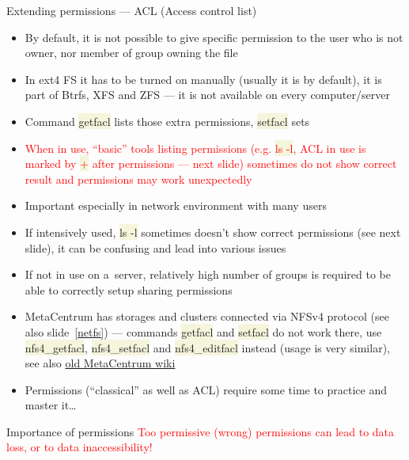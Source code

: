 \documentclass[compress, xelatex, 11pt, xcolor=svgnames, aspectratio=169,
	hyperref={
		bookmarks=true,
		unicode=true,
		colorlinks=true,
		pdftitle={Linux, command line and MetaCentrum},
		plainpages=false,
		pdfauthor={Vojtech Zeisek},
		pdfsubject={Course about use of Linux command line, writing shell scripts and using MetaCentrum of CESNET},
		pdfcreator={XeLaTeX},
		pdfkeywords={Linux, GNU, BASH, shell, command line, MetaCentrum},
		linkcolor=DarkRed, %
		anchorcolor=DarkBlue, %
		citecolor=Indigo, %
		filecolor=NavyBlue, %
		menucolor=DarkMagenta, %
		urlcolor=DarkBlue, %
		},
	url={hyphens, lowtilde} %
	]{beamer}
\renewcommand{\texttt}[1]{\colorbox{Beige}{{\ttfamily #1}}}
\renewcommand{\alert}[1]{\textcolor{red}{#1}}
\begin{document}
\begin{frame}[allowframebreaks]{Extending permissions --- ACL (Access control list)} %
	\label{acl}
	\begin{itemize}
		\item By default, it is not possible to give specific permission to the user who is not owner, nor member of group owning the file
		\item In ext4 FS it has to be turned on manually (usually it is by default), it is part of Btrfs, XFS and ZFS --- it is not available on every computer/server
		\item Command \texttt{getfacl} lists those extra permissions, \texttt{setfacl} sets
		\item \alert{When in use, \enquote{basic} tools listing permissions (e.g. \texttt{ls -l}, ACL in use is marked by \texttt{+} after permissions --- next slide) sometimes do not show correct result and permissions may work unexpectedly}
		\item Important especially in network environment with many users
		\item If intensively used, \texttt{ls -l} sometimes doesn't show correct permissions (see next slide), it can be confusing and lead into various issues
		\item If not in use on a~server, relatively high number of groups is required to be able to correctly setup sharing permissions
		\item MetaCentrum has storages and clusters connected via NFSv4 protocol (see also slide~\ref{netfs}) --- commands \texttt{getfacl} and \texttt{setfacl} do not work there, use \texttt{nfs4\_getfacl}, \texttt{nfs4\_setfacl} and \texttt{nfs4\_editfacl} instead (usage is very similar), see also \href{https://wiki.metacentrum.cz/wiki/Access_Control_Lists_on_NFSv4}{old MetaCentrum wiki}
		\item Permissions (\enquote{classical} as well as ACL) require some time to practice and master it\ldots
	\end{itemize}
	\begin{block}{Importance of permissions}
		\alert{Too permissive (wrong) permissions can lead to data loss, or to data inaccessibility!}
	\end{block}
\end{frame}
\end{document}
